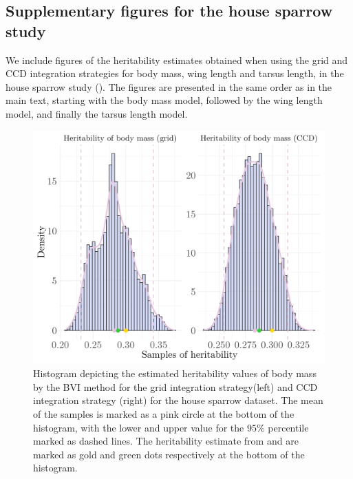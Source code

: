 \subsection*{Supplementary figures for the house sparrow study}
\label{sec:supplementary_sparrows}

We include figures of the heritability estimates obtained when using the grid and CCD integration strategies for body mass, wing length and tarsus length, in the house sparrow study (). The figures are presented in the same order as in the main text, starting with the body mass model, followed by the wing length model, and finally the tarsus length model.
\begin{figure}[ht]
  \centering
  \includegraphics[width=0.7\linewidth]{Figures/House sparrow study/Heritability_mass_combined.png}
  \caption[Estimated heritability of body mass from grid and CCD strategy]{Histogram depicting the estimated heritability values of body mass by the BVI method for the grid integration strategy(left) and CCD integration strategy (right) for the house sparrow dataset. The mean of the samples is marked as a pink circle at the bottom of the histogram, with the lower and upper value for the $95\%$ percentile marked as dashed lines. The heritability estimate from \citet{Silva2017} and \citet{Muff2019Genetic} are marked as gold and green dots respectively at the bottom of the histogram.}
  \label{fig:heritability_mass_combined_grid_ccd}
\end{figure}

